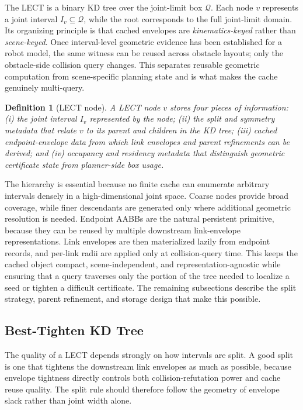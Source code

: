 \documentclass[journal]{IEEEtran}
\newtheorem{definition}{Definition}
\newcommand{\Q}{\ensuremath{\mathcal{Q}}}
\begin{document}
The LECT is a binary KD tree over the joint-limit box $\Q$. Each node $v$
represents a joint interval $I_v \subseteq \Q$, while the root corresponds to
the full joint-limit domain. Its organizing principle is that cached envelopes
are \emph{kinematics-keyed} rather than \emph{scene-keyed}. Once interval-level
geometric evidence has been established for a robot model, the same witness can
be reused across obstacle layouts; only the obstacle-side collision query
changes. This separates reusable geometric computation from scene-specific
planning state and is what makes the cache genuinely multi-query.

\begin{definition}[LECT node]
A LECT node $v$ stores four pieces of information: (i) the joint interval
$I_v$ represented by the node; (ii) the split and symmetry metadata that relate
$v$ to its parent and children in the KD tree; (iii) cached endpoint-envelope
data from which link envelopes and parent refinements can be derived; and
(iv) occupancy and residency metadata that distinguish geometric certificate
state from planner-side box usage.
\end{definition}

The hierarchy is essential because no finite cache can enumerate arbitrary
intervals densely in a high-dimensional joint space. Coarse nodes provide broad
coverage, while finer descendants are generated only where additional geometric
resolution is needed. Endpoint AABBs are the natural persistent primitive,
because they can be reused by multiple downstream link-envelope
representations. Link envelopes are then materialized lazily from endpoint
records, and per-link radii are applied only at collision-query time. This
keeps the cached object compact, scene-independent, and representation-agnostic
while ensuring that a query traverses only the portion of the tree needed to
localize a seed or tighten a difficult certificate. The remaining subsections
describe the split strategy, parent refinement, and storage design that make
this possible.

\subsection{Best-Tighten KD Tree}
\label{sec:lect_split}

The quality of a LECT depends strongly on how intervals are split. A good split
is one that tightens the downstream link envelopes as much as possible, because
envelope tightness directly controls both collision-refutation power and cache
reuse quality. The split rule should therefore follow the geometry of envelope
slack rather than joint width alone.
\end{document}
